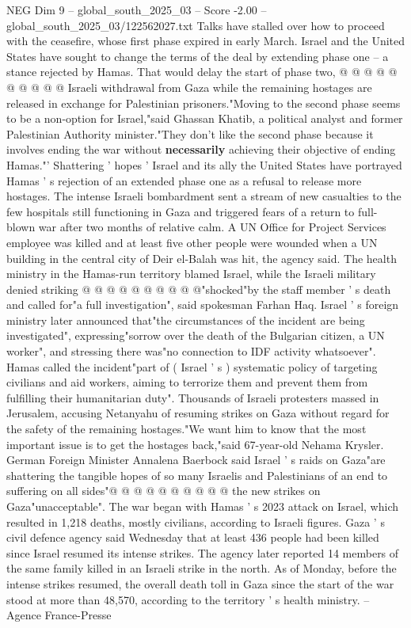 \begin{textsample}{NEG Dim 9 – global\_south\_2025\_03 – Score -2.00 – global\_south\_2025\_03/122562027.txt}
Talks have stalled over how to proceed with the ceasefire, whose first phase expired in early March.
Israel and the United States have sought to change the terms of the deal by extending phase one -- a stance rejected by Hamas.
That would delay the start of phase two, @ @ @ @ @ @ @ @ @ @ Israeli withdrawal from Gaza while the remaining hostages are released in exchange for Palestinian prisoners."Moving to the second phase seems to be a non-option for Israel,"said Ghassan Khatib, a political analyst and former Palestinian Authority minister."They don't like the second phase because it involves ending the war without \textbf{necessarily} achieving their objective of ending Hamas."' Shattering ' hopes ' Israel and its ally the United States have portrayed Hamas ' s rejection of an extended phase one as a refusal to release more hostages.
The intense Israeli bombardment sent a stream of new casualties to the few hospitals still functioning in Gaza and triggered fears of a return to full-blown war after two months of relative calm.
A UN Office for Project Services employee was killed and at least five other people were wounded when a UN building in the central city of Deir el-Balah was hit, the agency said.
The health ministry in the Hamas-run territory blamed Israel, while the Israeli military denied striking @ @ @ @ @ @ @ @ @ @"shocked"by the staff member ' s death and called for"a full investigation", said spokesman Farhan Haq.
Israel ' s foreign ministry later announced that"the circumstances of the incident are being investigated", expressing"sorrow over the death of the Bulgarian citizen, a UN worker", and stressing there was"no connection to IDF activity whatsoever".
Hamas called the incident"part of ( Israel ' s ) systematic policy of targeting civilians and aid workers, aiming to terrorize them and prevent them from fulfilling their humanitarian duty".
Thousands of Israeli protesters massed in Jerusalem, accusing Netanyahu of resuming strikes on Gaza without regard for the safety of the remaining hostages."We want him to know that the most important issue is to get the hostages back,"said 67-year-old Nehama Krysler.
German Foreign Minister Annalena Baerbock said Israel ' s raids on Gaza"are shattering the tangible hopes of so many Israelis and Palestinians of an end to suffering on all sides"@ @ @ @ @ @ @ @ @ @ the new strikes on Gaza"unacceptable".
The war began with Hamas ' s 2023 attack on Israel, which resulted in 1,218 deaths, mostly civilians, according to Israeli figures.
Gaza ' s civil defence agency said Wednesday that at least 436 people had been killed since Israel resumed its intense strikes.
The agency later reported 14 members of the same family killed in an Israeli strike in the north.
As of Monday, before the intense strikes resumed, the overall death toll in Gaza since the start of the war stood at more than 48,570, according to the territory ' s health ministry. -- Agence France-Presse

\end{textsample}

